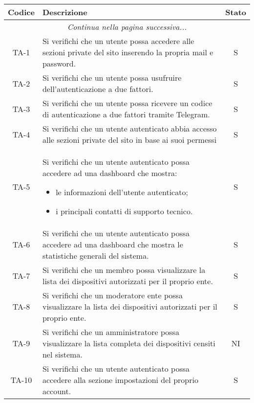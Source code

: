 		\begin{center}
			\begin{longtable}{|c|p{10cm}|c|}
			\hline
			\rowcolor{lighter-grayer}
			\textbf{Codice} & \textbf{Descrizione} & \textbf{Stato}  \\
			\hline
			\endhead
			\hline
	        \multicolumn{3}{|c|}{\textit{Continua nella pagina successiva...}}\\
	        \hline
	        \endfoot
	        \endlastfoot

			\hline
			 TA-1 & Si verifichi che un utente possa accedere alle sezioni private del sito inserendo la propria mail e password.
			  & S \\
			 \hline
			 TA-2 & Si verifichi che un utente possa usufruire dell'autenticazione a due fattori. & S \\
			 \hline
			 TA-3 & Si verifichi che un utente possa ricevere un codice di autenticazione a due fattori tramite Telegram. & S \\
			 \hline
			 TA-4 & Si verifichi che un utente autenticato abbia accesso alle sezioni private del sito in base ai suoi permessi & S \\
			 \hline
			 TA-5 & Si verifichi che un utente autenticato possa accedere ad una dashboard che mostra:
			 \begin{itemize}
			 	\item le informazioni dell'utente autenticato;
			 	\item i principali contatti di supporto tecnico.
			 \end{itemize} & S \\
			 \hline
			 TA-6 & Si verifichi che un utente autenticato possa accedere ad una dashboard che mostra le statistiche generali del sistema. & S \\
			 \hline
			 TA-7 & Si verifichi che un membro possa visualizzare la lista dei dispositivi autorizzati per il proprio ente. & S \\
			 \hline
			 TA-8 & Si verifichi che un moderatore ente possa visualizzare la lista dei dispositivi autorizzati per il proprio ente. & S \\
			 \hline
			 TA-9 & Si verifichi che un amministratore possa visualizzare la lista completa dei dispositivi censiti nel sistema. & NI \\
			 \hline
			 TA-10 & Si verifichi che un utente autenticato possa accedere alla sezione impostazioni del proprio account. & S \\

\end{longtable}
\end{center}
